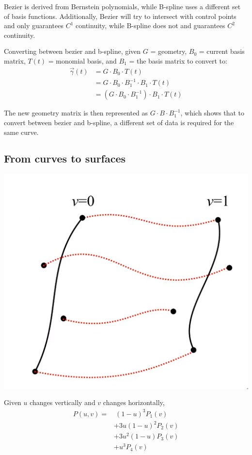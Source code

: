 \documentclass[12pt]{article}
\begin{document}
Bezier is derived from Bernstein polynomials, while B-spline uses a
different set of basis functions. Additionally, Bezier will try
to intersect with control points and only guarantees $C^1$ continuity,
while B-spline does not and guarantees $C^2$ continuity.

Converting between bezier and b-spline, given $G$ = geometry,
$B_0$ = current basis matrix, $T(t)$ = monomial basis, and $B_1$ =
the basis matrix to convert to:
\begin{align*}
    \vec \gamma(t) &= G \cdot B_0 \cdot T(t)\\
    &= G \cdot B_0 \cdot B_1^{-1} \cdot B_1 \cdot T(t)\\
    &= (G \cdot B_0 \cdot B_1^{-1}) \cdot B_1 \cdot T(t)
\end{align*}

The new geometry matrix is then represented as $G \cdot B \cdot
B_1^{-1}$, which shows that to convert between bezier and b-spline,
a different set of data is required for the same curve.

\subsection{From curves to surfaces}
\includegraphics[scale=2]{images/surface-example.png}

Given $u$ changes vertically and $v$ changes horizontally,
\begin{align*}
    P(u,v) =& \ (1-u)^3 P_1(v)\\
    &+ 3u(1-u)^2 P_2(v)\\
    &+ 3u^2(1-u) P_3(v)\\
    &+ u^3 P_4(v)
\end{align*}
\end{document}
